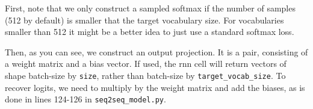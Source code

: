 \begin{Shaded}
\begin{Highlighting}[]
   \OperatorTok{>}   \OperatorTok{<} 
    \OperatorTok{=} \NormalTok{, [size, }\NormalTok{.target_vocab_size])}
    \OperatorTok{=} 
    \OperatorTok{=} \NormalTok{, [}\NormalTok{.target_vocab_size])}
    \OperatorTok{=} 

     
      \OperatorTok{=} \NormalTok{tf.reshape(labels, [}\OperatorTok{-}\NormalTok{, }\NormalTok{])}
       
\end{Highlighting}
\end{Shaded}

First, note that we only construct a sampled softmax if the number of
samples (512 by default) is smaller that the target vocabulary size. For
vocabularies smaller than 512 it might be a better idea to just use a
standard softmax loss.

Then, as you can see, we construct an output projection. It is a pair,
consisting of a weight matrix and a bias vector. If used, the rnn cell
will return vectors of shape batch-size by \texttt{size}, rather than
batch-size by \texttt{target\_vocab\_size}. To recover logits, we need
to multiply by the weight matrix and add the biases, as is done in lines
124-126 in \texttt{seq2seq\_model.py}.

\begin{Shaded}
\begin{Highlighting}[]
   \NormalTok{:}
  \OperatorTok{=} \NormalTok{[tf.matmul(output, output_projection[}\NormalTok{]) }\OperatorTok{+}
                     \NormalTok{output_projection[}\NormalTok{] } \NormalTok{...]}
\end{Highlighting}
\end{Shaded}

